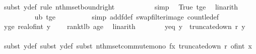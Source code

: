\begin{isabellebody}
\ {\isacharparenleft}{\kern0pt}subst\ y{\isacharunderscore}{\kern0pt}def{\isacharcomma}{\kern0pt}\ rule\ nth{\isacharunderscore}{\kern0pt}mset{\isacharunderscore}{\kern0pt}bound{\isacharunderscore}{\kern0pt}right{\isacharparenright}{\kern0pt}\isanewline
\ \ \ \ \ \ \ \ \ \isamarkupfalse%
\ simp\ \isamarkupfalse%
\ True\ t{\isacharunderscore}{\kern0pt}ge{\isacharunderscore}{\kern0pt}{}\ \isamarkupfalse%
\ linarith\isanewline
\ \ \ \ \ \ \ \ \isamarkupfalse%
\ ub\ t{\isacharunderscore}{\kern0pt}ge{\isacharunderscore}{\kern0pt}{}\isanewline
\ \ \ \ \ \ \ \ \isamarkupfalse%
\ {\isacharparenleft}{\kern0pt}simp\ add{\isacharcolon}{\kern0pt}f{\isacharunderscore}{\kern0pt}def\ swap{\isacharunderscore}{\kern0pt}filter{\isacharunderscore}{\kern0pt}image\ count{\isacharunderscore}{\kern0pt}le{\isacharunderscore}{\kern0pt}def{\isacharparenright}{\kern0pt}\isanewline
\isanewline
\ \ \ \ \ \ \isamarkupfalse%
\ y{\isacharunderscore}{\kern0pt}ge{\isacharunderscore}{\kern0pt}{}{\isacharcolon}{\kern0pt}\ {\isachardoublequoteopen}real{\isacharunderscore}{\kern0pt}of{\isacharunderscore}{\kern0pt}int\ y\ {\isasymge}\ {}{\isachardoublequoteclose}\ \isamarkupfalse%
\ rank{\isacharunderscore}{\kern0pt}t{\isacharunderscore}{\kern0pt}lb\ a{\isacharunderscore}{\kern0pt}ge{\isacharunderscore}{\kern0pt}{}\ \isamarkupfalse%
\ linarith\isanewline
\ \ \ \ \ \ \isamarkupfalse%
\ y{\isacharprime}{\kern0pt}{\isacharunderscore}{\kern0pt}eq{\isacharcolon}{\kern0pt}\ {\isachardoublequoteopen}y{\isacharprime}{\kern0pt}\ {\isacharequal}{\kern0pt}\ truncate{\isacharunderscore}{\kern0pt}down\ r\ y{\isachardoublequoteclose}\isanewline
\ \ \ \ \ \ \ \ \isamarkupfalse%
\ {\isacharparenleft}{\kern0pt}subst\ y{\isacharunderscore}{\kern0pt}def{\isacharcomma}{\kern0pt}\ subst\ y{\isacharprime}{\kern0pt}{\isacharunderscore}{\kern0pt}def{\isacharcomma}{\kern0pt}\ subst\ nth{\isacharunderscore}{\kern0pt}mset{\isacharunderscore}{\kern0pt}commute{\isacharunderscore}{\kern0pt}mono{\isacharbrackleft}{\kern0pt}\ f{\isacharequal}{\kern0pt}{\isachardoublequoteopen}{\isacharparenleft}{\kern0pt}{\isasymlambda}x{\isachardot}{\kern0pt}\ truncate{\isacharunderscore}{\kern0pt}down\ r\ {\isacharparenleft}{\kern0pt}of{\isacharunderscore}{\kern0pt}int\ x{\isacharparenright}{\kern0pt}{\isacharparenright}{\kern0pt}{\isachardoublequoteclose}{\isacharbrackright}{\kern0pt}{\isacharparenright}{\kern0pt}\ \isanewline

\end{isabellebody}
